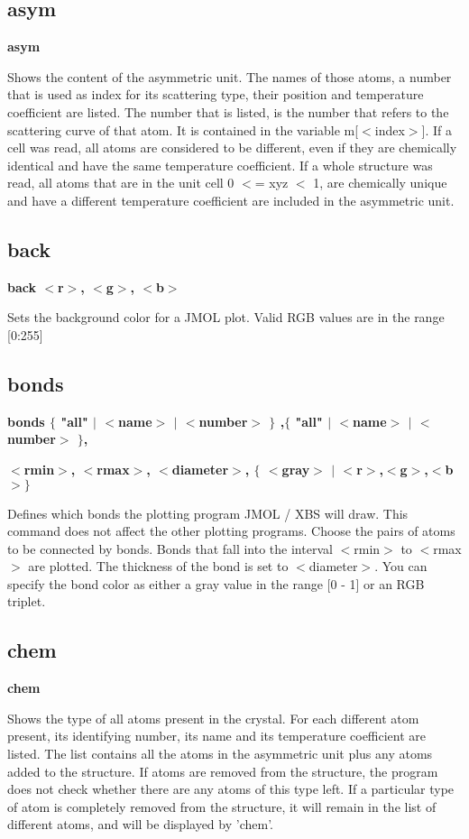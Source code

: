 \subsection*{asym}
{\bf asym \par }
\par
\vspace{3pt}
Shows the content of the asymmetric unit. The names of those atoms, 
a number that is used as index for its scattering type, their position 
and temperature coefficient are listed. The number that is listed, 
is the number that refers to the scattering curve of that atom. It is 
contained in the variable m[$ <$index$> $]. If a cell was read, all atoms 
are considered to be different, even if they are chemically identical 
and have the same temperature coefficient. If a whole structure was 
read, all atoms that are in the unit cell 0 $ <$= xyz $ <$ 1, are chemically 
unique and have a different temperature coefficient are included in 
the asymmetric unit. 
\subsection*{back}
{\bf back $ <$r$> $, $ <$g$> $, $ <$b$> $ \par }
\par
\vspace{3pt}
Sets the background color for a JMOL plot. 
Valid RGB values are in the range [0:255] 
\subsection*{bonds}
{\bf bonds $ \{$ "all" $| $ $ <$name$> $ $| $ $ <$number$> $ $\} $ ,$ \{$ "all" $| $ $ <$name$> $ $| $ $ <$number$> $ $\} $, \par }
{\bf       $ <$rmin$> $, $ <$rmax$> $, $ <$diameter$> $, $ \{$ $ <$gray$> $ $| $ $ <$r$> $,$ <$g$> $,$ <$b$> $$\} $ \par }
\par
\vspace{3pt}
Defines which bonds the plotting program JMOL / XBS will draw. This 
command does not affect the other plotting programs. 
Choose the pairs of atoms to be connected by bonds. Bonds that 
fall into the interval $ <$rmin$> $ to $ <$rmax$> $ are plotted. The thickness 
of the bond is set to $ <$diameter$> $. You can specify the bond color 
as either a gray value in the range [0 - 1] or an RGB triplet. 
\subsection*{chem}
{\bf chem \par }
\par
\vspace{3pt}
Shows the type of all atoms present in the crystal. For each 
different atom present, its identifying number, its name and its 
temperature coefficient are listed. The list contains all the atoms 
in the asymmetric unit plus any atoms added to the structure. If 
atoms are removed from the structure, the program does not check 
whether there are any atoms of this type left. If a particular type 
of atom is completely removed from the structure, it will remain in 
the list of different atoms, and will be displayed by 'chem'. 
